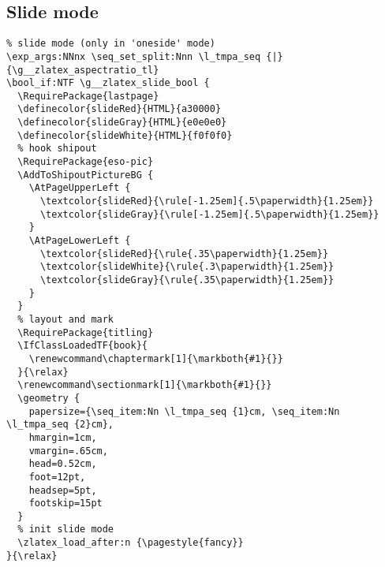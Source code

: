 \subsection{Slide mode}
\begin{verbatim}
% slide mode (only in 'oneside' mode)
\exp_args:NNnx \seq_set_split:Nnn \l_tmpa_seq {|}{\g__zlatex_aspectratio_tl}
\bool_if:NTF \g__zlatex_slide_bool {
  \RequirePackage{lastpage}
  \definecolor{slideRed}{HTML}{a30000}
  \definecolor{slideGray}{HTML}{e0e0e0}
  \definecolor{slideWhite}{HTML}{f0f0f0}
  % hook shipout
  \RequirePackage{eso-pic}
  \AddToShipoutPictureBG {
    \AtPageUpperLeft {
      \textcolor{slideRed}{\rule[-1.25em]{.5\paperwidth}{1.25em}}
      \textcolor{slideGray}{\rule[-1.25em]{.5\paperwidth}{1.25em}}
    }
    \AtPageLowerLeft {
      \textcolor{slideRed}{\rule{.35\paperwidth}{1.25em}}
      \textcolor{slideWhite}{\rule{.3\paperwidth}{1.25em}}
      \textcolor{slideGray}{\rule{.35\paperwidth}{1.25em}}
    }
  }
  % layout and mark
  \RequirePackage{titling}
  \IfClassLoadedTF{book}{
    \renewcommand\chaptermark[1]{\markboth{#1}{}}
  }{\relax}
  \renewcommand\sectionmark[1]{\markboth{#1}{}}
  \geometry {
    papersize={\seq_item:Nn \l_tmpa_seq {1}cm, \seq_item:Nn \l_tmpa_seq {2}cm},
    hmargin=1cm,
    vmargin=.65cm,
    head=0.52cm,
    foot=12pt,
    headsep=5pt,
    footskip=15pt
  }
  % init slide mode
  \zlatex_load_after:n {\pagestyle{fancy}}
}{\relax}
\end{verbatim}

